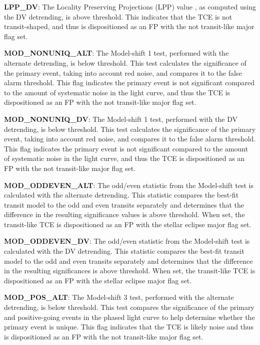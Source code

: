 \textbf{LPP\_DV}: The Locality Preserving Projections (LPP) value \citet{Thompson2015b}, as computed using the DV detrending, is above threshold. This indicates that the TCE is not transit-shaped, and thus is dispositioned as an FP with the not transit-like major flag set.

\textbf{MOD\_NONUNIQ\_ALT}: The Model-shift 1 test, performed with the alternate detrending, is below threshold. This test calculates the significance of the primary event, taking into account red noise, and compares it to the false alarm threshold. This flag indicates the primary event is not significant compared to the amount of systematic noise in the light curve, and thus the TCE is dispositioned as an FP with the not transit-like major flag set.

\textbf{MOD\_NONUNIQ\_DV}: The Model-shift 1 test, performed with the DV detrending, is below threshold. This test calculates the significance of the primary event, taking into account red noise, and compares it to the false alarm threshold. This flag indicates the primary event is not significant compared to the amount of systematic noise in the light curve, and thus the TCE is dispositioned as an FP with the not transit-like major flag set.

\textbf{MOD\_ODDEVEN\_ALT}: The odd/even statistic from the Model-shift test is calculated with the alternate detrending. This statistic compares the best-fit transit model to the odd and even transits separately and determines that the difference in the resulting significance values is above threshold. When set, the transit-like TCE is dispositioned as an FP with the stellar eclipse major flag set.

\textbf{MOD\_ODDEVEN\_DV}: The odd/even statistic from the Model-shift test is calculated with the DV detrending. This statistic compares the best-fit transit model to the odd and even transits separately and determines that the difference in the resulting significances is above threshold. When set, the transit-like TCE is dispositioned as an FP with the stellar eclipse major flag set.

\textbf{MOD\_POS\_ALT}: The Model-shift 3 test, performed with the alternate detrending, is below threshold. This test compares the significance of the primary and positive-going events in the phased light curve to help determine whether the primary event is unique. This flag indicates that the TCE is likely noise and thus is dispositioned as an FP with the not transit-like major flag set.

